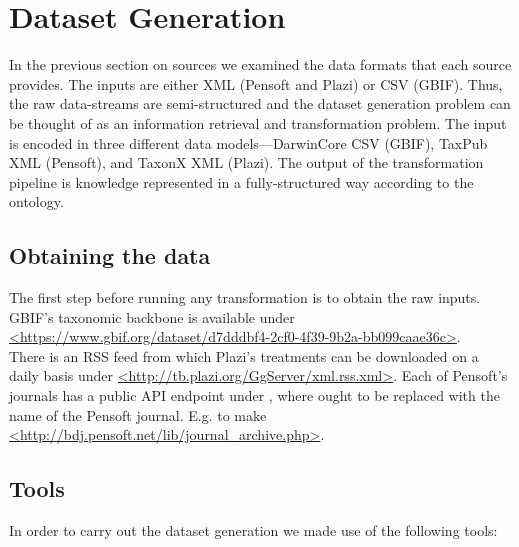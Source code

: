 



\section{Dataset Generation}

In the previous section on sources we examined the data formats that each source provides. The inputs are either XML (Pensoft and Plazi) or CSV (GBIF). Thus, the raw data-streams are semi-structured and the dataset generation problem can be thought of as an information retrieval and transformation problem. The input is encoded in three different data models---DarwinCore CSV (GBIF), TaxPub XML (Pensoft), and TaxonX XML (Plazi). The output of the transformation pipeline is  knowledge represented in a fully-structured way according to the ontology.

\subsection{Obtaining the data}

The first step before running any transformation is to obtain the raw inputs. GBIF's taxonomic backbone is available under\\ 
\url{<https://www.gbif.org/dataset/d7dddbf4-2cf0-4f39-9b2a-bb099caae36c>}.\\There is an RSS feed from which Plazi's treatments can be downloaded on a daily basis under \url{<http://tb.plazi.org/GgServer/xml.rss.xml>}. Each of Pensoft's journals has a public API endpoint under , where  ought to be replaced with the name of the Pensoft journal. E.g.  to make \url{<http://bdj.pensoft.net/lib/journal_archive.php>}.



\subsection{Tools}

In order to carry out the dataset generation we made use of the following tools:


